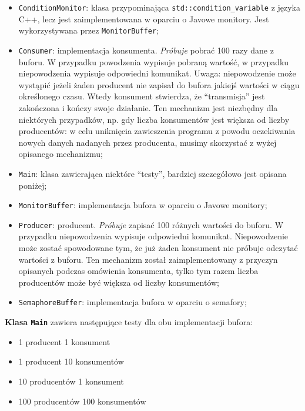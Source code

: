 \documentclass[11pt]{article}
\providecommand{\tightlist}{%
      \setlength{\itemsep}{0pt}\setlength{\parskip}{0pt}}
\begin{document}
\begin{itemize}
\tightlist
\item
  \texttt{ConditionMonitor}: klasa przypominająca
  \texttt{std::condition\_variable} z języka C++, lecz jest
  zaimplementowana w oparciu o Javowe monitory. Jest wykorzystywana
  przez \texttt{MonitorBuffer};
\item
  \texttt{Consumer}: implementacja konsumenta. \emph{Próbuje} pobrać 100
  razy dane z buforu. W przypadku powodzenia wypisuje pobraną wartość, w
  przypadku niepowodzenia wypisuje odpowiedni komunikat. Uwaga:
  niepowodzenie może wystąpić jeżeli żaden producent nie zapisał do
  bufora jakiejś wartości w ciągu określonego czasu. Wtedy konsument
  stwierdza, że ``transmisja'' jest zakończona i kończy swoje działanie.
  Ten mechanizm jest niezbędny dla niektórych przypadków, np. gdy liczba
  konsumentów jest większa od liczby producentów: w celu uniknięcia
  zawieszenia programu z powodu oczekiwania nowych danych nadanych przez
  producenta, musimy skorzystać z wyżej opisanego mechanizmu;
\item
  \texttt{Main}: klasa zawierająca niektóre ``testy'', bardziej
  szczegółowo jest opisana poniżej;
\item
  \texttt{MonitorBuffer}: implementacja bufora w oparciu o Javowe
  monitory;
\item
  \texttt{Producer}: producent. \emph{Próbuje} zapisać 100 różnych
  wartości do buforu. W przypadku niepowodzenia wypisuje odpowiedni
  komunikat. Niepowodzenie może zostać spowodowane tym, że już żaden
  konsument nie próbuje odczytać wartości z buforu. Ten mechanizm został
  zaimplementowany z przyczyn opisanych podczas omówienia konsumenta,
  tylko tym razem liczba producentów może być większa od liczby
  konsumentów;
\item
  \texttt{SemaphoreBuffer}: implementacja bufora w oparciu o semafory;
\end{itemize}

    \textbf{Klasa \texttt{Main}} zawiera następujące testy dla obu
implementacji bufora:

\begin{itemize}
\tightlist
\item
  1 producent 1 konsument
\item
  1 producent 10 konsumentów
\item
  10 producentów 1 konsument
\item
  100 producentów 100 konsumentów
\end{itemize}
\end{document}
